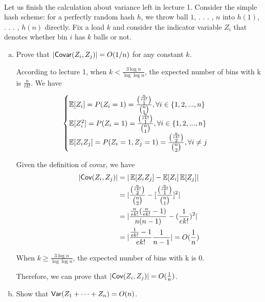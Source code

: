 ~\\
\begin{problem}[20 points.]
Let us finish the calculation about variance left in lecture 1. Consider the simple hash scheme: for a perfectly random hash $h$, we throw ball $1$, . . . , $n$ into $h(1)$, . . . , $h(n)$ directly. Fix a load $k$ and consider the indicator variable $Z_i$ that denotes whether bin $i$ has $k$ balls or not.

\begin{enumerate}[(a)]
\item Prove that $|\mathsf{Covar}(Z_i,Z_j)|=O(1/n)$ for any constant $k$.

\Answer

According to lecture 1, when $k<\frac{3\log n}{\log\log n}$, the expected number of bins with k is $\frac{n}{ek!}$. We have

\begin{align} \label{eq:4-1-1}
    \begin{cases}
        \operatorname*{\mathbb{E}}[Z_i] = P(Z_i=1)=\frac{\tbinom{\frac{n}{ek!}}{1}}{\tbinom{n}{1}} , \forall i \in \{1, 2, ... , n\}\\
        \operatorname*{\mathbb{E}}[Z_i^2] = P(Z_i=1)=\frac{\tbinom{\frac{n}{ek!}}{1}}{\tbinom{n}{1}} , \forall i \in \{1, 2, ... , n\} \\
        \operatorname*{\mathbb{E}}[Z_i Z_j] = P(Z_i=1, Z_j=1)=\frac{\tbinom{\frac{n}{ek!}}{2}}{\tbinom{n}{2}} , \forall i \neq j
    \end{cases}
\end{align}

Given the definition of covar, we have
\begin{align} \label{eq:4-1-2}
    \notag |\mathsf{Cov}(Z_i, Z_j)|&=|\operatorname*{\mathbb{E}}[Z_i Z_j] - \operatorname*{\mathbb{E}}[Z_i]\operatorname*{\mathbb{E}}[Z_j]|\\
    \notag &=|\frac{\tbinom{\frac{n}{ek!}}{2}}{\tbinom{n}{2}} - [\frac{\tbinom{\frac{n}{ek!}}{1}}{\tbinom{n}{1}}]^2|\\
    \notag & = |\frac{\frac{n}{ek!}{(\frac{n}{ek!}-1)}}{n(n-1)} - (\frac{1}{ek!})^2|\\
    & =| \frac{\frac{1}{ek!}-1}{ek!}\frac{1}{n-1}| = O(\frac{1}{n})
\end{align}

When $k \ge \frac{3\log n}{\log\log n}$, the expected number of bins with k is 0.

Therefore, we can prove that $ |\mathsf{Cov}(Z_i,Z_j)| =  O(\frac{1}{n})$.

\item Show that $ \mathsf{Var} (Z_1 + \dots+Z_n)=O(n)$.

\Answer


\end{enumerate}
\end{problem}
